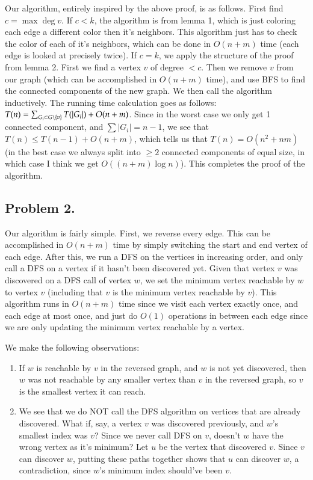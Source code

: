 \documentclass[12pt]{article}
\theoremstyle{definitionstyle}
\newcommand{\SET}[1]{\Set{\mskip-\medmuskip #1 \mskip-\medmuskip}}
\begin{document}
    Our algorithm, entirely inspired by the above proof, is as follows. First find $c = \max \deg v$. If $c < k$, the algorithm is from lemma 1, which is just coloring each edge a different color then it's neighbors. This algorithm just has to check the color of each of it's neighbors, which can be done in $O(n+m)$ time (each edge is looked at precisely twice). If $c = k$, we apply the structure of the proof from lemma 2. First we find a vertex $v$ of degree $< c$. Then we remove $v$ from our graph (which can be accomplished in $O(n+m)$ time), and use BFS to find the connected components of the new graph. We then call the algorithm inductively. The running time calculation goes as follows: $T(n) = \sum_{G_i \subset G \setminus \SET{v}} T(|G_i|) + O(n+m)$. Since in the worst case we only get 1 connected component, and $\sum |G_i| = n-1$, we see that $T(n) \leq T(n-1) + O(n+m)$, which tells us that $T(n) = O(n^2+nm)$ (in the best case we always split into $\geq 2$ connected components of equal size, in which case I think we get $O((n+m)\log n)$). This completes the proof of the algorithm.

    \subsection*{Problem 2.}
    Our algorithm is fairly simple. First, we reverse every edge. This can be accomplished in $O(n+m)$ time by simply switching the start and end vertex of each edge. After this, we run a DFS on the vertices in increasing order, and only call a DFS on a vertex if it hasn't been discovered yet. Given that vertex $v$ was discovered on a DFS call of vertex $w$, we set the minimum vertex reachable by $w$ to vertex $v$ (including that $v$ is the minimum vertex reachable by $v$). This algorithm runs in $O(n+m)$ time since we visit each vertex exactly once, and each edge at most once, and just do $O(1)$ operations in between each edge since we are only updating the minimum vertex reachable by a vertex.

    We make the following observations:
    \begin{enumerate}[label=(\arabic*)]
        \item If $w$ is reachable by $v$ in the reversed graph, and $w$ is not yet discovered, then $w$ was not reachable by any smaller vertex than $v$ in the reversed graph, so $v$ is the smallest vertex it can reach. 
        \item We see that we do NOT call the DFS algorithm on vertices that are already discovered. What if, say, a vertex $v$ was discovered previously, and $w$'s smallest index was $v$? Since we never call DFS on $v$, doesn't $w$ have the wrong vertex as it's minimum? Let $u$ be the vertex that discovered $v$. Since $v$ can discover $w$, putting these paths together shows that $u$ can discover $w$, a contradiction, since $w$'s minimum index should've been $v$. 
    \end{enumerate}
\end{document}
